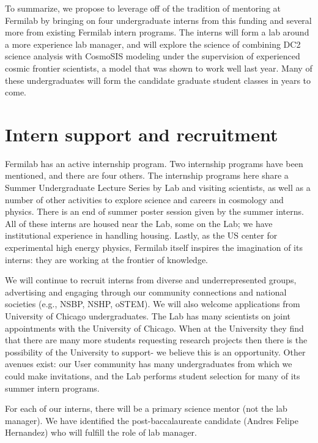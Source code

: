 To summarize, we  propose to leverage off of the tradition 
of mentoring at Fermilab by
bringing on four undergraduate interns from this funding
and several more from existing Fermilab intern programs.
The interns will form a lab around a more experience
lab manager, and will explore the science
of combining DC2 science analysis with CosmoSIS modeling
under the supervision of experienced cosmic
frontier scientists, a model that was shown to work
well last year. Many of these  undergraduates will
form the candidate graduate student classes in years to come.

\newpage
\section{Intern support and recruitment}

Fermilab has an active internship program. Two internship programs
have been mentioned, and there are four others. The internship
programs here share a Summer Undergraduate Lecture Series by
Lab and visiting scientists, as well as a number of other activities to explore science and careers in cosmology and physics. There is an end of summer poster
session given by the summer interns. All of these interns
are housed near the Lab, some on the Lab; we have institutional
experience in handling housing. Lastly, as the US center for
experimental high energy physics, Fermilab itself inspires
the imagination of its interns: they are working at the frontier
of knowledge.

We will continue to recruit interns from diverse and underrepresented groups, 
advertising and engaging through our community connections and national societies (e.g., NSBP, NSHP, oSTEM). 
We will also welcome applications from University of Chicago undergraduates. 
The Lab has many scientists on joint appointments with
the University of Chicago. When at the University they find
that there are  many more students
requesting research projects then there is the possibility of
the University to support- we believe this is an opportunity.
Other avenues exist: our User community has many undergraduates
from which we could make invitations, 
and the Lab performs student selection for many of its summer
intern programs.

For each of our interns, there will be a primary science mentor (not the lab manager). 
We have identified the post-baccalaureate candidate (Andres Felipe Hernandez) who will fulfill the role of lab manager.



